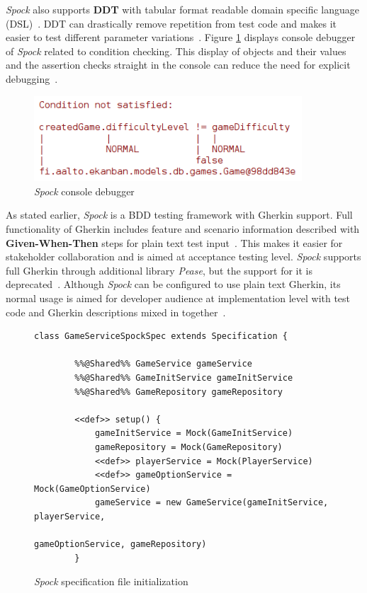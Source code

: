     \textit{Spock} also supports \textbf{DDT} with tabular format readable
    domain specific language (DSL)~\cite{spock}.
    DDT can drastically remove repetition from test code and makes it easier to test different parameter
    variations~\cite{kapelonis2016java}.
    Figure \ref{fig:spock-debug} displays console debugger of \textit{Spock} related to
    condition checking. This display of objects and their values and the assertion checks straight in the console
    can reduce the need for explicit debugging~\cite{kapelonis2016java}.
    \begin{figure}[ht]
      \begin{center}
        \begin{topbot}[style=mdstyle]
        \includegraphics[width=10cm]{images/spock-debug.png}
        \end{topbot}
        \caption{\textit{Spock} console debugger}
        \label{fig:spock-debug}
      \end{center}
    \end{figure}

    As stated earlier, \textit{Spock} is a BDD testing framework with Gherkin support.
    Full functionality of Gherkin includes feature and scenario information described
    with \textbf{Given-When-Then} steps for plain text test input~\cite{gherkin}. This makes it easier for stakeholder collaboration
    and is aimed at acceptance testing level.
    \textit{Spock} supports full Gherkin through additional library \textit{Pease}, but the support for it is deprecated~\cite{spock-pease}.
    Although \textit{Spock} can be configured to use plain text Gherkin, its normal usage is aimed for developer audience at implementation
    level with test code and Gherkin descriptions mixed in together~\cite{okolnychyi2016study}.

    \begin{figure}[ht]
        \begin{lstlisting}[style=java]
    class GameServiceSpockSpec extends Specification {

        %%@Shared%% GameService gameService
        %%@Shared%% GameInitService gameInitService
        %%@Shared%% GameRepository gameRepository

        <<def>> setup() {
            gameInitService = Mock(GameInitService)
            gameRepository = Mock(GameRepository)
            <<def>> playerService = Mock(PlayerService)
            <<def>> gameOptionService = Mock(GameOptionService)
            gameService = new GameService(gameInitService, playerService,
                                          gameOptionService, gameRepository)
        }
        \end{lstlisting}
        \caption{\textit{Spock} specification file initialization}
        \label{fig:spock-init}
    \end{figure}

